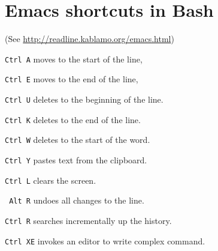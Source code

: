 \section{Emacs shortcuts in Bash}
{\small(See \url{http://readline.kablamo.org/emacs.html})}
\begin{compactenum}
\item \texttt{Ctrl A} moves to the start of the line,
\item \texttt{Ctrl E} moves to the end of the line,
\item \texttt{Ctrl U} deletes to the beginning of the line.
\item \texttt{Ctrl K} deletes to the end of the line.
\item \texttt{Ctrl W} deletes to the start of the word.
\item \texttt{Ctrl Y} pastes text from the clipboard.
\item \texttt{Ctrl L} clears the screen.
\item \texttt{ Alt R} undoes all changes to the line.
\item \texttt{Ctrl R} searches incrementally up the history.
\item \texttt{Ctrl XE} invokes an editor to write complex command.
\end{compactenum}

